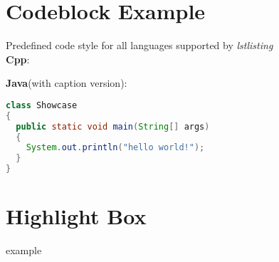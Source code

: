 \documentclass{assignment}
\begin{document}

\section*{Codeblock Example}

Predefined code style for all languages supported by \textit{lstlisting}\\
\textbf{Cpp}:

\textbf{Java}(with caption version):
\begin{lstlisting}[language=Java, caption={Showcase.java}]
class Showcase
{
  public static void main(String[] args)
  {
    System.out.println("hello world!");
  }
}
\end{lstlisting}

\section*{Highlight Box}

 example
\end{document}
